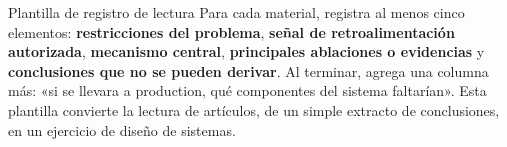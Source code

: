 \documentclass[a4paper]{article}
\begin{document}
\begin{knowledgebox}{Plantilla de registro de lectura}
Para cada material, registra al menos cinco elementos: \textbf{restricciones del problema}, \textbf{señal de retroalimentación autorizada}, \textbf{mecanismo central}, \textbf{principales ablaciones o evidencias} y \textbf{conclusiones que no se pueden derivar}. Al terminar, agrega una columna más: «si se llevara a production, qué componentes del sistema faltarían». Esta plantilla convierte la lectura de artículos, de un simple extracto de conclusiones, en un ejercicio de diseño de sistemas.
\end{knowledgebox}
\end{document}
